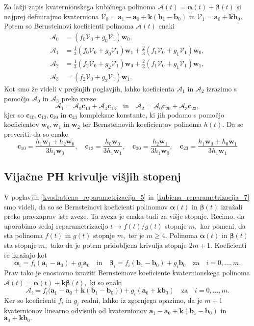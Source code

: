 \documentclass[12pt,a4paper,twoside]{article}
\theoremstyle{definition} %
\theoremstyle{plain} %
\numberwithin{equation}{section}  %
\newcommand{\aV}{\mathbf{a}}
\newcommand{\bV}{\mathbf{b}}
\newcommand{\cV}{\mathbf{c}}
\newcommand{\kV}{\mathbf{k}}
\newcommand{\wV}{\mathbf{w}}
\newcommand{\AQ}{\mathcal{A}}
\newcommand{\VQ}{\mathcal{V}}
\newcommand{\balpha}{\boldsymbol \alpha}
\newcommand{\bbeta}{\boldsymbol \beta}
\begin{document}
Za lažji zapis kvaternionskega kubičnega polinoma $\AQ(t)=\balpha(t)+\bbeta(t)$ si najprej definirajmo kvaterniona $\VQ_0=\aV_1-\aV_0+\kV(\bV_1-\bV_0)$ in $\VQ_1=\aV_0+\kV\bV_0.$ Potem so Bernsteinovi koeficienti polinoma $\AQ(t)$ enaki
\begin{align*}
	\AQ_0&=(f_0\VQ_0+g_0\VQ_1)\wV_0,\\
	\AQ_1&=\frac{1}{3}(f_0\VQ_0+g_0\VQ_1)\wV_1+\frac{2}{3}(f_1\VQ_0+g_1\VQ_1)\wV_0,\\
	\AQ_2&=\frac{1}{3}(f_2\VQ_0+g_2\VQ_1)\wV_0+\frac{2}{3}(f_1\VQ_0+g_1\VQ_1)\wV_1,\\
	\AQ_3&=(f_2\VQ_0+g_2\VQ_1)\wV_1.
\end{align*}
Kot smo že videli v prejšnjih poglavjih, lahko koeficienta $\AQ_1$ in $\AQ_2$ izrazimo s pomočjo $\AQ_0$ in $\AQ_3$ preko zveze
\begin{equation*}
	\AQ_1=\AQ_0\cV_{10}+\AQ_3\cV_{13}\quad\text{in}\quad\AQ_2=\AQ_0\cV_{20}+\AQ_3\cV_{23},
\end{equation*}
kjer so $\cV_{10},\cV_{13},\cV_{20}$ in $\cV_{23}$ kompleksne konstante, ki jih podamo s pomočjo koeficientov $\wV_0,\wV_1$ in $\wV_2$ ter Bernsteinovih koeficientov polinoma $h(t).$ Da se preveriti. da so enake
\begin{equation}
	\cV_{10}=\frac{h_1\wV_1+h_2\wV_0}{3h_1\wV_0},\quad\cV_{13}=\frac{h_0\wV_0}{3h_1\wV_1},\quad\cV_{20}=\frac{h_2\wV_1}{3h_1\wV_0},\quad\cV_{23}=\frac{h_1\wV_0+h_0\wV_1}{3h_1\wV_1}
\end{equation}

\subsection{Vijačne PH krivulje višjih stopenj}

V poglavjih \ref{kvadraticna_reparametrizacija_5} in \ref{kubicna_reparametrizacija_7} smo videli, da so se Bernsteinovi koeficienti polinomov $\balpha(t)$ in $\bbeta(t)$ izražali preko pravzaprav iste zveze. Ta zveza je enaka tudi za višje stopnje. Recimo, da uporabimo sedaj reparametrizacijo $t\to f(t)/g(t)$ stopnje $m,$ kar pomeni, da sta polinoma $f(t)$ in $g(t)$ stopnje $m,$ ter je $m\geq 4.$ Polinoma $\balpha(t)$ in $\bbeta(t)$ sta stopnje $m,$ tako da je potem pridobljena krivulja stopnje $2m+1.$ Koeficienti se izražajo kot
\begin{equation*}
	\balpha_i=f_i(\aV_1-\aV_0)+g_i\aV_0\quad\text{in}\quad\bbeta_i=f_i(\bV_1-\bV_0)+g_i\bV_0\quad\text{za}\quad i=0,\dots,m.
\end{equation*}
Prav tako je enostavno izraziti Bernsteinove koeficiente kvaternionskega polinoma $\AQ(t)=\balpha(t)+\kV\bbeta(t),$ ki so enaki
\begin{equation*}
	\AQ_i=f_i\big(\aV_1-\aV_0+\kV(\bV_1-\bV_0)\big)+g_i(\aV_0+\kV\bV_0)\quad\text{za}\quad i=0,\dots,m.
\end{equation*}
Ker so koeficienti $f_i$ in $g_i$ realni, lahko iz zgornjega opazimo, da je $m+1$ kvaternionov linearno odvisnih od kvaternionov $\aV_1-\aV_0+\kV(\bV_1-\bV_0)$ in $\aV_0+\kV\bV_0.$
\end{document}
